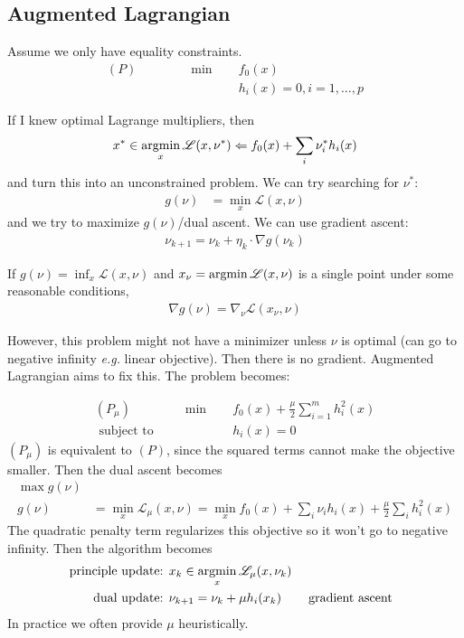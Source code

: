 \documentclass[class=article,crop=false]{standalone}
\begin{document}
\subsection{Augmented Lagrangian}

Assume we only have equality constraints.
\begin{align*}
	(P) \qquad \qquad \min\quad &f_0(x) \\
&h_i(x) = 0 , i = 1,\ldots,p
\end{align*}

If I knew optimal Lagrange multipliers, then 
\begin{align*}
	x^* \in \operatorname*{argmin}_x \mathscr{L}(x, \nu^* ) \Leftarrow f_0(x) + \sum_i \nu_i^* h_i(x)
\end{align*}
and turn this into an unconstrained problem. We can try searching for $  \nu^* $:
\begin{align*}
	g(\nu) &= \min_{x} \mathscr{L}(x,\nu)
\end{align*}
and we try to maximize $ g(\nu)$/dual ascent. We can use gradient ascent: 
\begin{align*}
	\nu_{k+1} = \nu_k + \eta_k \cdot \nabla g(\nu_k)
\end{align*}
\begin{prop}
	If $ g(\nu) = \inf_x \mathscr{L}(x,\nu)$ and $ x_{\nu} = \operatorname*{argmin} \mathscr{L}(x,\nu)$ is a single point under some reasonable conditions,
	\begin{align*}
		\nabla g(\nu) = \nabla _\nu \mathscr{L}(x_{\nu}, \nu)
	\end{align*}
\end{prop}

However, this problem might not have a minimizer unless $ \nu$ is optimal (can go to negative infinity \emph{e.g.} linear objective). Then there is no gradient. Augmented Lagrangian aims to fix this. The problem becomes:

\begin{align*}
	(P_{\mu}) \qquad \qquad \min\quad &f_0(x) + \frac{\mu}{2} \sum_{ i= 1}^{ m} h_i^2(x) \\
\text{ subject to}\quad  &h_i(x) = 0
\end{align*}
$ (P_{\mu})$ is equivalent to $ (P)$, since the squared terms cannot make the objective smaller. Then the dual ascent becomes
 \begin{align*}
	 \max g(\nu)\\
	 g(\nu) &= \min_{x} \mathscr{L}_{\mu}(x,\nu) =\min_x f_0(x) + \sum_i \nu_i h_i(x) + \frac{\mu}{2} \sum_i h_i^2(x)
\end{align*}
The quadratic penalty term regularizes this objective so it won't go to negative infinity. Then the algorithm becomes
\begin{align*}
	\text{ principle update: }& x_k \in \operatorname*{argmin}_{x} \mathscr{L}_{\mu} (x, \nu_k) \\
	\text{ dual update: }& \nu_{k+1} = \nu_k + \mu h_i(x_k) && \text{ gradient ascent} 
\end{align*}
In practice we often provide $ \mu$ heuristically.
\end{document}
